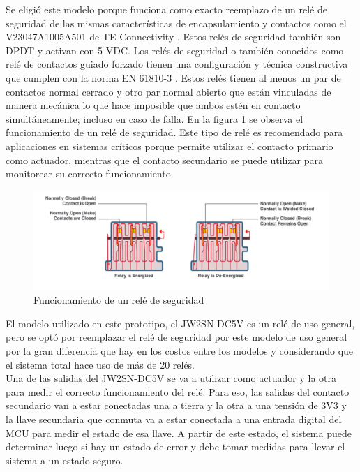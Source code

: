 Se eligió este modelo porque funciona como exacto reemplazo de un relé de seguridad de las mismas características de encapsulamiento y contactos como el V23047A1005A501 de TE Connectivity \cite{V23047A1005A501}. Estos relés de seguridad también son DPDT y activan con 5 VDC. Los relés de seguridad o también conocidos como relé de contactos guiado forzado tienen una configuración y técnica constructiva que cumplen con la norma EN 61810-3 \cite{norma_61810}. Estos relés tienen al menos un par de contactos normal cerrado y otro par normal abierto que están vinculadas de manera mecánica lo que hace imposible que ambos estén en contacto simultáneamente; incluso en caso de falla. En la figura \ref{fig:rele_seguridad} se observa el funcionamiento de un relé de seguridad. Este tipo de relé es recomendado para aplicaciones en sistemas críticos porque permite utilizar el contacto primario como actuador, mientras que el contacto secundario se puede utilizar para monitorear su correcto funcionamiento. \\



\begin{figure}[H]
    \centering
    \includegraphics[width = \linewidth]{img/rele_seguridad.png}
    \caption{Funcionamiento de un relé de seguridad \cite{rele_img}}
    \label{fig:rele_seguridad}
\end{figure}


El modelo utilizado en este prototipo, el JW2SN-DC5V es un relé de uso general, pero se optó por reemplazar el relé de seguridad por este modelo de uso general por la gran diferencia que hay en los costos entre los modelos y considerando que el sistema total hace uso de más de 20 relés. \\

Una de las salidas del JW2SN-DC5V se va a utilizar como actuador y la otra para medir el correcto funcionamiento del relé. Para eso, las salidas del contacto secundario van a estar conectadas una a tierra y la otra a una tensión de 3V3 y la llave secundaria que conmuta va a estar conectada a una entrada digital del MCU para medir el estado de esa llave. A partir de este estado, el sistema puede determinar luego si hay un estado de error y debe tomar medidas para llevar el sistema a un estado seguro. \\


